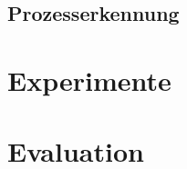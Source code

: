 \documentclass{article}
\begin{document}
\subsection{Prozesserkennung}

\section{Experimente}
\section{Evaluation}
\end{document}
